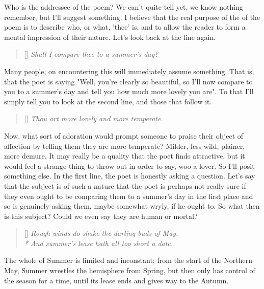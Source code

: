 \documentclass[]{article}
\begin{document}
Who is the addressee of the poem? We can't quite tell yet, we know nothing remember, but I'll suggest something. I believe that the real purpose of the of the poem is to describe who, or what, 'thee' is, and to allow the reader to form a mental impression of their nature. Let's look back at the line again.

\begin{verse}[\versewidth]
	\itshape
	Shall I compare thee to a summer’s day?\\
\end{verse}

Many people, on encountering this will immediately assume something. That is, that the poet is saying "Well, you're clearly so beautiful, so I'll now compare to you to a summer's day and tell you how much more lovely you are". To that I'll simply tell you to look at the second line, and those that follow it.

\begin{verse}[\versewidth]
	\itshape
	Thou art more lovely and more temperate.\\
\end{verse}

Now, what sort of adoration would prompt someone to praise their object of affection by telling them they are more temperate? Milder, less wild, plainer, more demure. It may really be a quality that the poet finds attractive, but it would feel a strange thing to throw out in order to say, woo a lover. So I'll posit something else. In the first line, the poet is honestly asking a question. Let's say that the subject is of such a nature that the poet is perhaps not really sure if they even ought to be comparing them to a summer's day in the first place and so is genuinely asking them, maybe somewhat wryly, if he ought to. So what then is this subject? Could we even say they are human or mortal?

\begin{verse}[\versewidth]
	\itshape
	Rough winds do shake the darling buds of May,\\*
	And summer’s lease hath all too short a date.\\
\end{verse}

The whole of Summer is limited and inconstant; from the start of the Northern May, Summer wrestles the hemisphere from Spring, but then only has control of the season for a time, until its lease ends and gives way to the Autumn.\\
\end{document}
